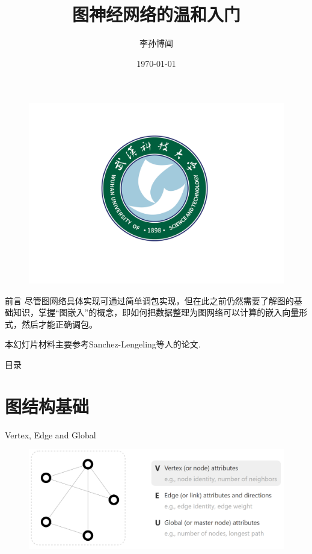 \documentclass{beamer}
\author[Sunbowen Lee]{李孙博闻}
\title[Graph neural network]{图神经网络的温和入门}
\institute{武汉科技大学 \\ 理学院 \\ 冶金工业过程系统科学湖北省重点实验室}
\date{\today}
\begin{document}
\kaishu
\begin{frame}  %
    \titlepage
    \begin{figure}[htpb]
        \centering
        \vspace{-0.7cm}
        \includegraphics[width=0.45\linewidth]{wust.png}
    \end{figure}
\end{frame}

\begin{frame}{前言}
    尽管图网络具体实现可通过简单调包实现，但在此之前仍然需要了解图的基础知识，掌握``图嵌入''的概念，即如何把数据整理为图网络可以计算的嵌入向量形式，然后才能正确调包。\newline

    本幻灯片材料主要参考Sanchez-Lengeling\cite{sanchez-lengeling2021a}等人的论文.
\end{frame}

\begin{frame}{目录}
        \tableofcontents[sectionstyle=show,subsectionstyle=hide]
\end{frame}


\section{图结构基础}


\begin{frame}{Vertex, Edge and Global}
    \begin{figure}
        \includegraphics[width=\textwidth]{vertex.png}
    \end{figure}
\end{frame}
\end{document}
